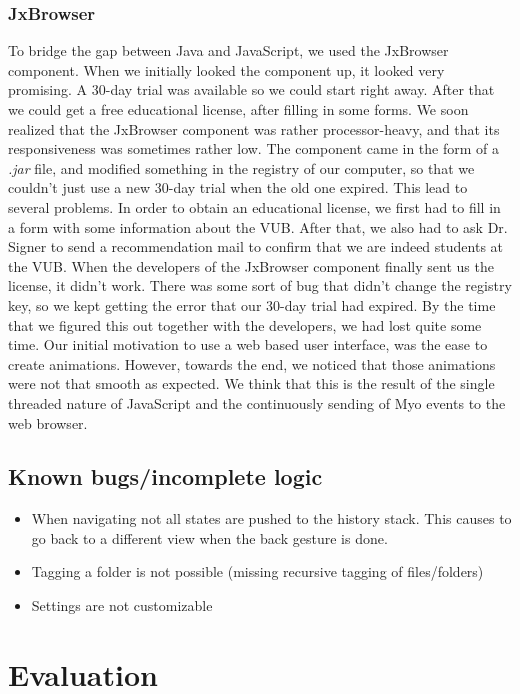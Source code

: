 \documentclass{article}
\begin{document}
\subsubsection{JxBrowser}
To bridge the gap between Java and JavaScript, we used the JxBrowser component. When we initially looked the component up, it looked very promising. A 30-day trial was available so we could start right away. After that we could get a free educational license, after filling in some forms. We soon realized that the JxBrowser component was rather processor-heavy, and that its responsiveness was sometimes rather low. The component came in the form of a \textit{.jar} file, and modified something in the registry of our computer, so that we couldn't just use a new 30-day trial when the old one expired. This lead to several problems. In order to obtain an educational license, we first had to fill in a form with some information about the VUB. After that, we also had to ask Dr. Signer to send a recommendation mail to confirm that we are indeed students at the VUB. When the developers of the JxBrowser component finally sent us the license, it didn't work. There was some sort of bug that didn't change the registry key, so we kept getting the error that our 30-day trial had expired. By the time that we figured this out together with the developers, we had lost quite some time.
Our initial motivation to use a web based user interface, was the ease to create animations. However, towards the end, we noticed that those animations were not that smooth as expected. We think that this is the result of the single threaded nature of JavaScript and the continuously sending of Myo events to the web browser.

\subsection{Known bugs/incomplete logic}
\begin{itemize}
\item When navigating not all states are pushed to the history stack. This causes to go back to a different view when the back gesture is done.
\item Tagging a folder is not possible (missing recursive tagging of files/folders)
\item Settings are not customizable
\end{itemize}

\newpage
\section{Evaluation}
\end{document}

